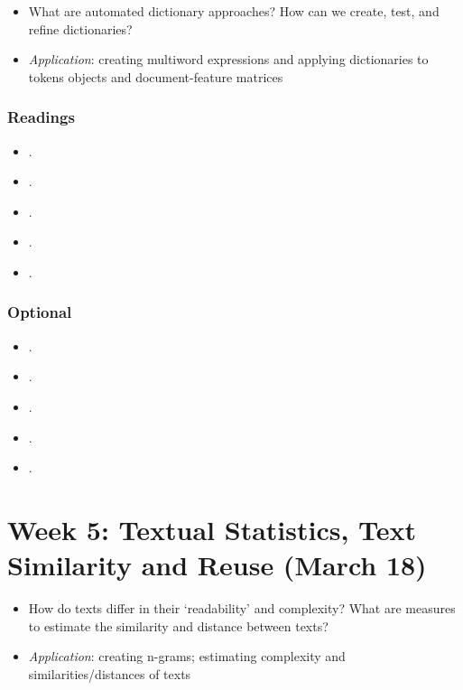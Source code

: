 \documentclass[abstract=on,parskip=full,headings=standardclasses,fontsize=11pt,paper=a4]{scrartcl}
\begin{document}
\begin{itemize}
\renewcommand\labelitemi{--}
\item What are automated dictionary approaches? How can we create, test, and refine dictionaries?
\item \textit{Application}: creating multiword expressions and applying dictionaries to tokens objects and document-feature matrices
\end{itemize}

\subsubsection*{Readings}
\begin{itemize}
\item {}.
\item {}.
\item {}.
\item {}.
\item {}.
\end{itemize}

\subsubsection*{Optional}
\begin{itemize}
\item {}.
\item {}.
\item {}.
\item {}.
\item {}.
\end{itemize}

\section{Week 5: Textual Statistics, Text Similarity and Reuse (March 18)}

\begin{itemize}
\renewcommand\labelitemi{--}
\item How do texts differ in their `readability' and complexity? What are measures to estimate the similarity and distance between texts?
\item \textit{Application}: creating n-grams; estimating complexity and similarities/distances of texts
\end{itemize}
\end{document}
